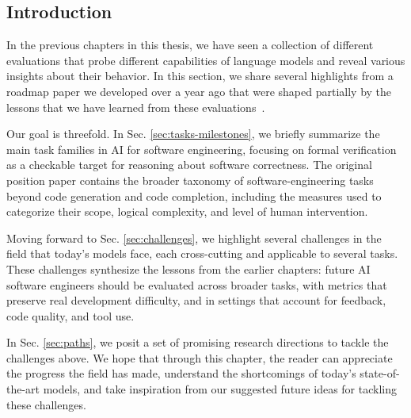 \subsection{Introduction}

In the previous chapters in this thesis, we have seen a collection of different evaluations that probe different capabilities
of language models and reveal various insights about their behavior. In this section, we share several 
highlights from a roadmap paper we developed over a year ago that were shaped partially by the
lessons that we have learned from these evaluations~\cite{gu2025positionaiswe}.

Our goal is threefold. In Sec. \ref{sec:tasks-milestones}, we briefly summarize the
main task families in AI for software engineering, focusing on formal verification as
a checkable target for reasoning about software correctness. The original position
paper contains the broader taxonomy of software-engineering tasks beyond code
generation and code completion, including the measures used to categorize their scope,
logical complexity, and level of human intervention.

Moving forward to Sec. \ref{sec:challenges}, we highlight several challenges in the field that today's models face,
each cross-cutting and applicable to several tasks. These challenges synthesize the lessons from the earlier chapters:
future AI software engineers should be evaluated across broader tasks, with metrics that preserve real
development difficulty, and in settings that account for feedback, code quality, and tool use.

In Sec. \ref{sec:paths}, we posit a set of promising research directions to tackle the challenges above.
We hope that through this chapter, the reader can appreciate the progress the field has made, understand
the shortcomings of today's state-of-the-art models, and take inspiration from our suggested future ideas
for tackling these challenges.
